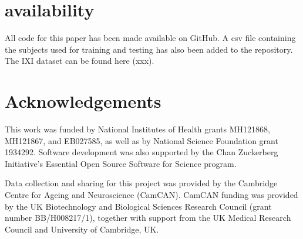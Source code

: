 \documentclass[pdflatex,sn-mathphys-num]{sn-jnl}
\begin{document}
\section{availability}

All code for this paper has been made available on GitHub. A csv file containing the subjects used for training and testing has also been added to the repository. The IXI dataset can be found here (xxx).


\section{Acknowledgements}

This work was funded by National Institutes of Health grants MH121868, MH121867, and EB027585, as well as by National Science Foundation grant 1934292. Software development was also supported by the Chan Zuckerberg Initiative's Essential Open Source Software for Science program.

Data collection and sharing for this project was provided by the Cambridge Centre for Ageing and Neuroscience (CamCAN). CamCAN funding was provided by the UK Biotechnology and Biological Sciences Research Council (grant number BB/H008217/1), together with support from the UK Medical Research Council and University of Cambridge, UK.


\end{document}
